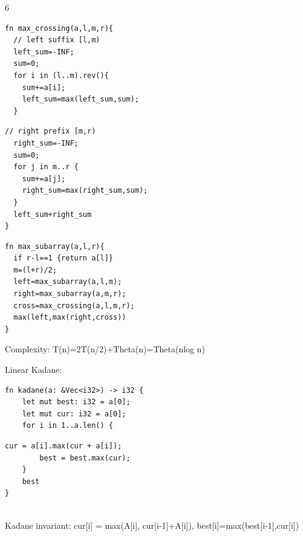 \documentclass[a4paper,landscape]{article}
\begin{document}
\begin{multicols*}{6}
\noindent
\begin{minipage}[t]{0.32\linewidth}\vspace{0pt}
\begin{lstlisting}[aboveskip=0pt,belowskip=0pt]
fn max_crossing(a,l,m,r){
  // left suffix [l,m)
  left_sum=-INF;
  sum=0;
  for i in (l..m).rev(){
    sum+=a[i];
    left_sum=max(left_sum,sum);
  }
\end{lstlisting}
\end{minipage}\hfill
\begin{minipage}[t]{0.32\linewidth}\vspace{0pt}
\begin{lstlisting}[aboveskip=0pt,belowskip=0pt]
  // right prefix [m,r)
  right_sum=-INF;
  sum=0;
  for j in m..r {
    sum+=a[j];
    right_sum=max(right_sum,sum);
  }
  left_sum+right_sum
}
\end{lstlisting}
\end{minipage}\hfill
\begin{minipage}[t]{0.32\linewidth}\vspace{0pt}
\begin{lstlisting}[aboveskip=0pt,belowskip=0pt]
fn max_subarray(a,l,r){
  if r-l==1 {return a[l]}
  m=(l+r)/2;
  left=max_subarray(a,l,m);
  right=max_subarray(a,m,r);
  cross=max_crossing(a,l,m,r);
  max(left,max(right,cross))
}
\end{lstlisting}
\end{minipage}

Complexity: T(n)=2T(n/2)+Theta(n)=Theta(nlog n)

Linear Kadane:

\begin{minipage}[t]{0.32\linewidth}\vspace{0pt}
\begin{lstlisting}[aboveskip=0pt,belowskip=0pt]
fn kadane(a: &Vec<i32>) -> i32 {
    let mut best: i32 = a[0];
    let mut cur: i32 = a[0];
    for i in 1..a.len() {
\end{lstlisting}
\end{minipage}\hfill
\begin{minipage}[t]{0.52\linewidth}\vspace{0pt}
\begin{lstlisting}[aboveskip=0pt,belowskip=0pt]
        cur = a[i].max(cur + a[i]);
        best = best.max(cur);
    }
    best
}
\end{lstlisting}
\end{minipage}\\
Kadane invariant:
cur[i] = max(A[i], cur[i-1]+A[i]), best[i]=max(best[i-1],cur[i])


\end{multicols*}
\end{document}
